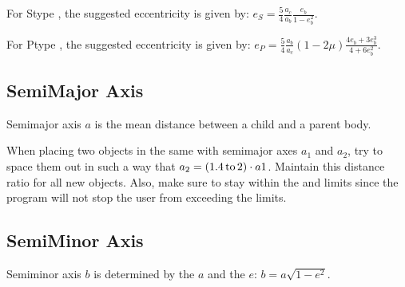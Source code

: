 \documentclass[letterpaper,10pt,english]{sphinxmanual}
\begin{document}
\sphinxAtStartPar
For S\sphinxhyphen{}type {\hyperref[\detokenize{celestial_systems/binary_system:id1}]{}}, the suggested eccentricity is given by:
\(e_S = \frac{5}{4} \frac{a_c}{a_b} \frac{e_b}{1-e_b^2}\).

\sphinxAtStartPar
For P\sphinxhyphen{}type {\hyperref[\detokenize{celestial_systems/binary_system:id1}]{}}, the suggested eccentricity is given by:
\(e_P = \frac{5}{4} \frac{a_b}{a_c} (1-2\mu) \frac{4 e_b + 3e_b^3}{4 + 6e_b^2}\).


\subsection{Semi\sphinxhyphen{}Major Axis}
\label{\detokenize{quantities/orbital/semi_major_axis:semi-major-axis}}\label{\detokenize{quantities/orbital/semi_major_axis::doc}}\label{\detokenize{quantities/orbital/semi_major_axis:id1}}
\sphinxAtStartPar
Semi\sphinxhyphen{}major axis \(a\) is the mean distance between a child and a parent body.

\sphinxAtStartPar
When placing two objects in the same {\hyperref[\detokenize{celestial_systems/celestial_systems:id1}]{}}
with semi\sphinxhyphen{}major axes \(a_1\) and \(a_2\),
try to space them out in such a way that \(a_2 = (1.4 \, {\rm to} \, 2) \cdot a1\).
Maintain this distance ratio for all new objects.
Also, make sure to stay within the {\hyperref[\detokenize{quantities/orbital/semi_major_axis_minimum_limit:id1}]{}}
and {\hyperref[\detokenize{quantities/orbital/semi_major_axis_maximum_limit:id1}]{}} limits since
the program will not stop the user from exceeding the limits.


\subsection{Semi\sphinxhyphen{}Minor Axis}
\label{\detokenize{quantities/orbital/semi_minor_axis:semi-minor-axis}}\label{\detokenize{quantities/orbital/semi_minor_axis::doc}}\label{\detokenize{quantities/orbital/semi_minor_axis:id1}}
\sphinxAtStartPar
Semi\sphinxhyphen{}minor axis \(b\) is determined by the {\hyperref[\detokenize{quantities/orbital/semi_major_axis:id1}]{}} \(a\) and the
{\hyperref[\detokenize{quantities/orbital/eccentricity:id1}]{}} \(e\): \(b = a \sqrt{1 - e^2}\).
\end{document}
